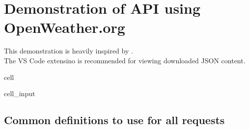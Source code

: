 \documentclass[letterpaper,10pt,english]{jupyterBook}
\begin{document}
\sphinxstepscope


\section{Demonstration of API using OpenWeather.org}
\label{\detokenize{2_Data_sources/APIs/OpenWeather:demonstration-of-api-using-openweather-org}}\label{\detokenize{2_Data_sources/APIs/OpenWeather::doc}}
\sphinxAtStartPar
This demonstration is heavily inspired by .\\
The VS Code extensino  is recommended for viewing downloaded JSON content.

\begin{sphinxuseclass}{cell}\begin{sphinxVerbatimInput}

\begin{sphinxuseclass}{cell_input}
\begin{sphinxVerbatim}[commandchars=\\\{\}]
   
 
 
\end{sphinxVerbatim}

\end{sphinxuseclass}\end{sphinxVerbatimInput}

\end{sphinxuseclass}

\subsection{Common definitions to use for all requests}
\label{\detokenize{2_Data_sources/APIs/OpenWeather:common-definitions-to-use-for-all-requests}}
\end{document}
